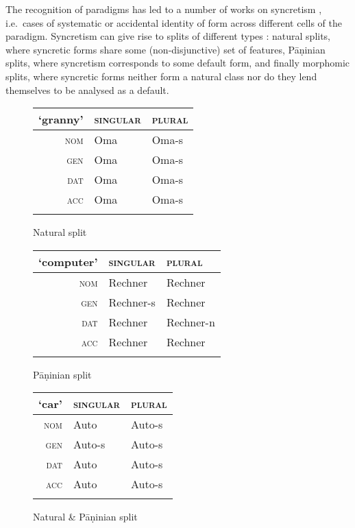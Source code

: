 \documentclass[output=paper
 	        ,biblatex
                ,babelshorthands
                ,newtxmath
                ,draftmode
                ,colorlinks, citecolor=brown
]{langscibook}
\begin{document}
The recognition of paradigms has led to a number of works on
syncretism \citep[see, e.g.][]{Baerman05}, i.e.\ cases of systematic or
accidental identity of form across different cells of the
paradigm. Syncretism can give rise to splits of different types
\citep{Corbett15}: natural splits, where syncretic forms share some
(non-disjunctive) set of features, Pāṇinian splits, where syncretism
corresponds to some default form, and finally morphomic splits, where
syncretic forms neither form a natural class nor do they lend
themselves to be analysed as a default. 

\begin{table}
  \centering
  
  \begin{subfigure}{.45\textwidth}
    
    \centering
    \begin{tabular}{r|ll}
      \lsptoprule
      `granny' & \textsc{singular} & \textsc{plural}\\
      \midrule
      \textsc{nom} & Oma & Oma-s\\
      \textsc{gen} & Oma & Oma-s\\
      \textsc{dat} & Oma & Oma-s\\
      \textsc{acc} & Oma & Oma-s\\
      \lspbottomrule
    \end{tabular}

    \caption{Natural split}
  \end{subfigure}  
  \begin{subfigure}{.50\textwidth}
    
    \centering
    \begin{tabular}{r|ll}
      \lsptoprule
      `computer' & \textsc{singular} & \textsc{plural}\\
      \midrule
      \textsc{nom} & Rechner & Rechner\\
      \textsc{gen} & Rechner-s & Rechner\\
      \textsc{dat} & Rechner & Rechner-n\\
      \textsc{acc} & Rechner & Rechner\\
      \lspbottomrule
    \end{tabular}
    \caption{Pāṇinian split}
  \end{subfigure}

  \begin{subfigure}{.45\textwidth}
    \centering

    \begin{tabular}{r|ll}
        \lsptoprule
        `car' & \textsc{singular} & \textsc{plural}\\
        \midrule
        \textsc{nom} & Auto & Auto-s\\
        \textsc{gen} & Auto-s & Auto-s\\
        \textsc{dat} & Auto & Auto-s\\
        \textsc{acc} & Auto & Auto-s\\
        \lspbottomrule
      \end{tabular}
      \caption{Natural \& Pāṇinian split}
    \end{subfigure}
  \begin{subfigure}{.50\textwidth}


\end{subfigure}
\end{table}
\end{document}
